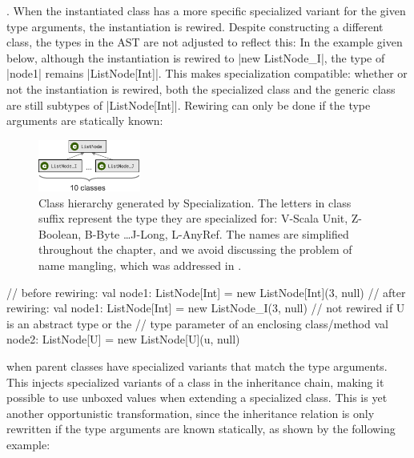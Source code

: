 . When the instantiated class has a more specific specialized variant for the given type arguments, the instantiation is rewired. Despite constructing a different class, the types in the AST are not adjusted to reflect this: In the example given below, although the instantiation is rewired to |new ListNode_I|, the type of |node1| remains |ListNode[Int]|. This makes specialization compatible: whether or not the instantiation is rewired, both the specialized class and the generic class are still subtypes of |ListNode[Int]|. Rewiring can only be done if the type arguments are statically known:

\begin{figure}[t]
    \centering
    \includegraphics[width=0.30\textwidth]{diags/spec-diag.eps}

    \caption{Class hierarchy generated by Specialization. The letters in class suffix represent the type they are specialized for: V-Scala Unit, Z-Boolean, B-Byte \ldots J-Long, L-AnyRef. The names are simplified throughout the chapter, and we avoid discussing the problem of name mangling, which was addressed in \cite{iuli-thesis}.}
    \label{mbox:fig-spec-diag}

\end{figure}

\begin{lstlisting-nobreak}
 // before rewiring:
 val node1: ListNode[Int] =
        new ListNode[Int](3, null)
 // after rewiring:
 val node1: ListNode[Int] =
        new ListNode_I(3, null)
 // not rewired if U is an abstract type or the
 // type parameter of an enclosing class/method
 val node2: ListNode[U] =
        new ListNode[U](u, null)
\end{lstlisting-nobreak}

 when parent classes have specialized variants that match the type arguments. This injects specialized variants of a class in the inheritance chain, making it possible to use unboxed values when extending a specialized class. This is yet another opportunistic transformation, since the inheritance relation is only rewritten if the type arguments are known statically, as shown by the following example:

